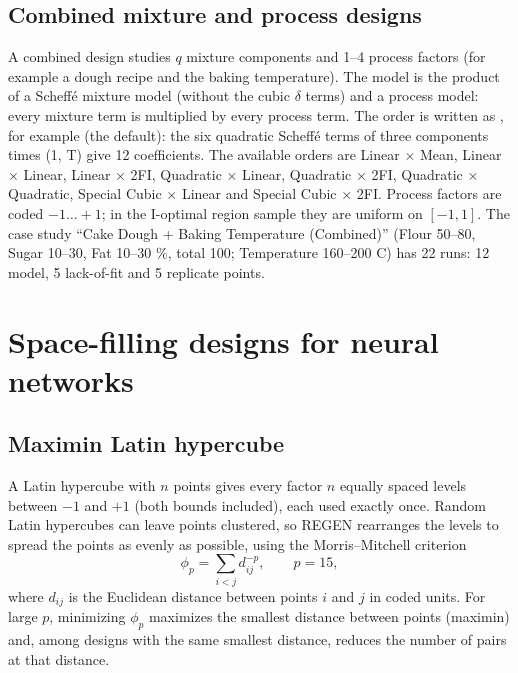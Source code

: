 \subsection{Combined mixture and process designs}
A combined design studies $q$ mixture components and 1--4 process factors (for example a dough recipe and the
baking temperature). The model is the product of a Scheff\'e mixture model (without the cubic $\delta$ terms) and a
process model: every mixture term is multiplied by every process term. The order is written as , for example  (the default): the six quadratic Scheff\'e terms of
three components times (1, T) give 12 coefficients. The available orders are Linear $\times$ Mean, Linear $\times$
Linear, Linear $\times$ 2FI, Quadratic $\times$ Linear, Quadratic $\times$ 2FI, Quadratic $\times$ Quadratic,
Special Cubic $\times$ Linear and Special Cubic $\times$ 2FI. Process factors are coded $-1 \dots +1$; in the
I-optimal region sample they are uniform on $[-1, 1]$. The case study ``Cake Dough + Baking Temperature (Combined)''
(Flour 50--80, Sugar 10--30, Fat 10--30 \%, total 100; Temperature 160--200 \textdegree C) has 22 runs: 12 model, 5
lack-of-fit and 5 replicate points.

\section{Space-filling designs for neural networks}
\label{sec:ch03-spacefilling}

\subsection{Maximin Latin hypercube}
A Latin hypercube with $n$ points \citep{mckay1979} gives every factor $n$ equally spaced levels between $-1$ and
$+1$ (both bounds included), each used exactly once. Random Latin hypercubes can leave points clustered, so REGEN
rearranges the levels to spread the points as evenly as possible, using the Morris--Mitchell criterion
\citep{morris1995}
\begin{equation}
\phi_p = \sum_{i<j} d_{ij}^{-p}, \qquad p = 15,
\label{eq:ch03-phip}
\end{equation}
where $d_{ij}$ is the Euclidean distance between points $i$ and $j$ in coded units. For large $p$, minimizing
$\phi_p$ maximizes the smallest distance between points (maximin) and, among designs with the same smallest
distance, reduces the number of pairs at that distance.

